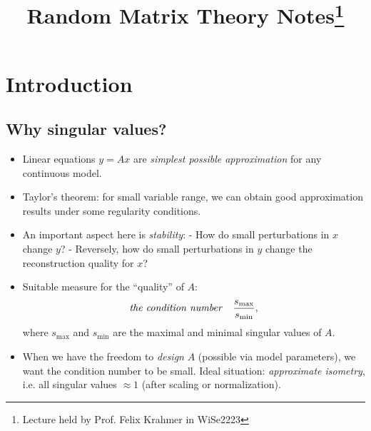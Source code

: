 
\title{\textbf{Random Matrix Theory Notes}\footnote{Lecture held by Prof. Felix Krahmer in WiSe2223}}

\maketitle
\tableofcontents 
\newpage
\setcounter{page}{1}
\section{Introduction}
\subsection{Why singular values?}
\begin{itemize}[itemsep=0pt]
\item Linear equations $y=Ax$ are \emph{simplest possible approximation} for any continuous model.
\item Taylor's theorem: for small variable range, we can obtain good approximation results under some regularity conditions.
\item An important aspect here is \emph{stability}:
\subitem - How do small perturbations in $x$ change $y$? 
\subitem - Reversely, how do small perturbations in $y$ change the reconstruction quality for $x$?
\item Suitable measure for the ``quality'' of $A$:
$$\text{\emph{the condition number}} \quad \frac{s_{\max}}{s_{\min}},$$
where $s_{\max}$ and $s_{\min}$ are the maximal and minimal singular values of $A$.
\item When we have the freedom to \emph{design} $A$ (possible via model parameters), we want the condition number to be small. Ideal situation: \emph{approximate isometry}, i.e. all singular values $\approx 1$ (after scaling or normalization).
\end{itemize}
